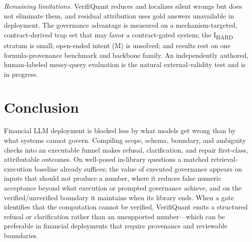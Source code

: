 \emph{Remaining limitations.}
VerifiQuant reduces and localizes silent wrongs but does not eliminate them, and residual attribution uses gold answers unavailable in deployment.
The governance advantage is measured on a mechanism-targeted, contract-derived trap set that may favor a contract-gated system; the I\textsubscript{HARD} stratum is small; open-ended intent (M) is unsolved; and results rest on one formula-provenance benchmark and backbone family.
An independently authored, human-labeled messy-query evaluation is the natural external-validity test and is in progress.

\section{Conclusion}
Financial LLM deployment is blocked less by what models get wrong than by what systems cannot govern.
Compiling scope, schema, boundary, and ambiguity checks into an executable funnel makes refusal, clarification, and repair first-class, attributable outcomes.
On well-posed in-library questions a matched retrieval-execution baseline already suffices; the value of executed governance appears on inputs that should not produce a number, where it reduces false numeric acceptance beyond what execution or prompted governance achieve, and on the verified/unverified boundary it maintains when its library ends.
When a gate identifies that the computation cannot be verified, VerifiQuant emits a structured refusal or clarification rather than an unsupported number---which can be preferable in financial deployments that require provenance and reviewable boundaries.
